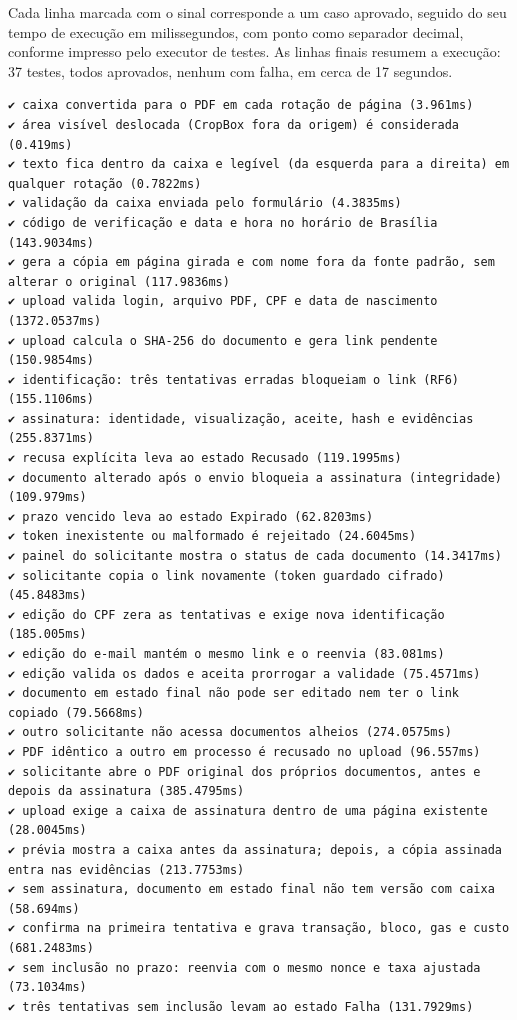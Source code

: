 \documentclass[
    12pt,
    a4paper,
    oneside,
    chapter=TITLE,
    section=TITLE,
    subsection=TITLE,
    subsubsection=TITLE,
    sumario=tradicional,
    english,
    brazil
]{abntex2}
\begin{document}
\begin{apendicesenv}
Cada linha marcada com o sinal  corresponde a um caso aprovado, seguido do seu tempo de execução em milissegundos, com ponto como separador decimal, conforme impresso pelo executor de testes. As linhas finais resumem a execução: 37 testes, todos aprovados, nenhum com falha, em cerca de 17 segundos.

\begin{lstlisting}[style=saida]
✔ caixa convertida para o PDF em cada rotação de página (3.961ms)
✔ área visível deslocada (CropBox fora da origem) é considerada (0.419ms)
✔ texto fica dentro da caixa e legível (da esquerda para a direita) em qualquer rotação (0.7822ms)
✔ validação da caixa enviada pelo formulário (4.3835ms)
✔ código de verificação e data e hora no horário de Brasília (143.9034ms)
✔ gera a cópia em página girada e com nome fora da fonte padrão, sem alterar o original (117.9836ms)
✔ upload valida login, arquivo PDF, CPF e data de nascimento (1372.0537ms)
✔ upload calcula o SHA-256 do documento e gera link pendente (150.9854ms)
✔ identificação: três tentativas erradas bloqueiam o link (RF6) (155.1106ms)
✔ assinatura: identidade, visualização, aceite, hash e evidências (255.8371ms)
✔ recusa explícita leva ao estado Recusado (119.1995ms)
✔ documento alterado após o envio bloqueia a assinatura (integridade) (109.979ms)
✔ prazo vencido leva ao estado Expirado (62.8203ms)
✔ token inexistente ou malformado é rejeitado (24.6045ms)
✔ painel do solicitante mostra o status de cada documento (14.3417ms)
✔ solicitante copia o link novamente (token guardado cifrado) (45.8483ms)
✔ edição do CPF zera as tentativas e exige nova identificação (185.005ms)
✔ edição do e-mail mantém o mesmo link e o reenvia (83.081ms)
✔ edição valida os dados e aceita prorrogar a validade (75.4571ms)
✔ documento em estado final não pode ser editado nem ter o link copiado (79.5668ms)
✔ outro solicitante não acessa documentos alheios (274.0575ms)
✔ PDF idêntico a outro em processo é recusado no upload (96.557ms)
✔ solicitante abre o PDF original dos próprios documentos, antes e depois da assinatura (385.4795ms)
✔ upload exige a caixa de assinatura dentro de uma página existente (28.0045ms)
✔ prévia mostra a caixa antes da assinatura; depois, a cópia assinada entra nas evidências (213.7753ms)
✔ sem assinatura, documento em estado final não tem versão com caixa (58.694ms)
✔ confirma na primeira tentativa e grava transação, bloco, gas e custo (681.2483ms)
✔ sem inclusão no prazo: reenvia com o mesmo nonce e taxa ajustada (73.1034ms)
✔ três tentativas sem inclusão levam ao estado Falha (131.7929ms)

\end{lstlisting}
\end{apendicesenv}
\end{document}
